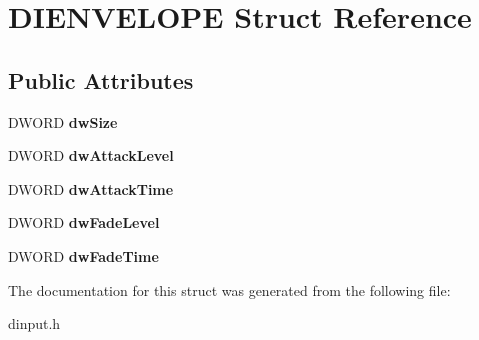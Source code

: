 \hypertarget{struct_d_i_e_n_v_e_l_o_p_e}{\section{D\-I\-E\-N\-V\-E\-L\-O\-P\-E Struct Reference}
\label{struct_d_i_e_n_v_e_l_o_p_e}
}
\subsection*{Public Attributes}
\begin{DoxyCompactItemize}
\item 
\hypertarget{struct_d_i_e_n_v_e_l_o_p_e_acc09a52f3a79c6342b752232023eb1ca}{D\-W\-O\-R\-D {\bfseries dw\-Size}}\label{struct_d_i_e_n_v_e_l_o_p_e_acc09a52f3a79c6342b752232023eb1ca}

\item 
\hypertarget{struct_d_i_e_n_v_e_l_o_p_e_a121eabd147a26ee01ded94a067afdea1}{D\-W\-O\-R\-D {\bfseries dw\-Attack\-Level}}\label{struct_d_i_e_n_v_e_l_o_p_e_a121eabd147a26ee01ded94a067afdea1}

\item 
\hypertarget{struct_d_i_e_n_v_e_l_o_p_e_a633c3f494b3b3a3207adf978f4332465}{D\-W\-O\-R\-D {\bfseries dw\-Attack\-Time}}\label{struct_d_i_e_n_v_e_l_o_p_e_a633c3f494b3b3a3207adf978f4332465}

\item 
\hypertarget{struct_d_i_e_n_v_e_l_o_p_e_a7711d14aa85e64421f15403867ac4ee4}{D\-W\-O\-R\-D {\bfseries dw\-Fade\-Level}}\label{struct_d_i_e_n_v_e_l_o_p_e_a7711d14aa85e64421f15403867ac4ee4}

\item 
\hypertarget{struct_d_i_e_n_v_e_l_o_p_e_aa713f947869bc1d295cd4da6584d024b}{D\-W\-O\-R\-D {\bfseries dw\-Fade\-Time}}\label{struct_d_i_e_n_v_e_l_o_p_e_aa713f947869bc1d295cd4da6584d024b}

\end{DoxyCompactItemize}


The documentation for this struct was generated from the following file\-:\begin{DoxyCompactItemize}
\item 
dinput.\-h\end{DoxyCompactItemize}
